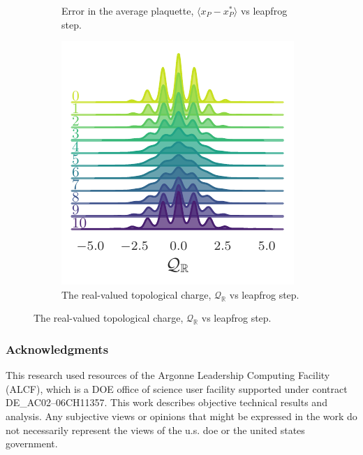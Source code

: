 \documentclass{article} %
\begin{document}
\begin{figure}[htpb]
\begin{subfigure}{0.49\textwidth}
      \caption{\label{fig:plaqsf}Error in the average plaquette, \(\langle x_{P}-x_{P}^{*}\rangle\) vs
      leapfrog step.}
   \end{subfigure}
   \hfill
   \begin{subfigure}{0.49\textwidth}
      \includegraphics[width=\textwidth]{figures/sinQf_1755.pdf}
      \caption{\label{fig:sinQf}The real-valued topological charge, \(\mathcal{Q}_{\mathbb{R}}\) vs leapfrog step.}%
   \end{subfigure}
\end{figure}
%

\subsubsection*{Acknowledgments}
This research used resources of the Argonne Leadership Computing Facility (ALCF), which is a DOE office of science user
facility supported under contract DE\_AC02--06CH11357.%
%
This work describes objective technical results and analysis.
%
Any subjective views or opinions that might be expressed in the work do not necessarily represent the views of the u.s.
doe or the united states government.
\end{document}
